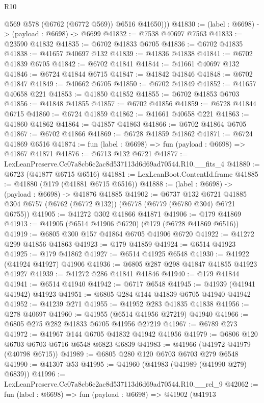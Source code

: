 \begin{lexlean}{R10}
\begin{coremodule}
          @569
          @578
          (@6762 (@6772 @569))
          @6516
          @41650)))
@41830 := (label : @6698) -> (payload : @6698) -> @6699
@41832 := @7538 @40697 @7563
@41833 := @23590 @41832
@41835 := @6702 @41833 @6705
@41836 := @6702 @41835
@41838 := @41657 @40697 @132
@41839 := @41836 @41838
@41841 := @6702 @41839 @6705
@41842 := @6702 @41841
@41844 := @41661 @40697 @132
@41846 := @6724 @41844 @6715
@41847 := @41842 @41846
@41848 := @6702 @41847
@41849 := @40662 @6705
@41850 := @6702 @41849
@41852 := @41657 @40658 @221
@41853 := @41850 @41852
@41855 := @6702 @41853 @6703
@41856 := @41848 @41855
@41857 := @6702 @41856
@41859 := @6728 @41844 @6715
@41860 := @6724 @41859
@41862 := @41661 @40658 @221
@41863 := @41860 @41862
@41864 := @41857 @41863
@41866 := @6702 @41864 @6705
@41867 := @6702 @41866
@41869 := @6728 @41859 @41862
@41871 := @6724 @41869 @6516
@41874 := fun (label : @6698) => fun (payload : @6698) => @41867 @41871
@41876 := @6713 @132 @6721
@41877 := LexLeanPreserve.Cc07a8cb6c2ac8d537113d6d69ad70544.R10.__fits_4
@41880 := @6723 (@41877 @6715 @6516)
@41881 := LexLeanBoot.ContentId.frame
@41885 := @41880 (@179 (@41881 @6715 @6516))
@41888 := (label : @6698) -> (payload : @6698) -> @41876 @41885
@41902 := @6737
    @132
    @6721
    @41885
    @304
    @6757
    (@6762 (@6772 @132))
    (@6778 (@6779 (@6780 @304) @6721 @6755))
@41905 := @41272 @302 @41866 @41871
@41906 := @179 @41869
@41913 := @41905 (@6514 @41906 @6720) (@179 (@6728 @41869 @6516))
@41919 := @6805 @300 @157 @41864 @6705 @41906 @6720
@41922 := @41272 @299 @41856 @41863
@41923 := @179 @41859
@41924 := @6514 @41923
@41925 := @179 @41862
@41927 := @6514 @41925 @6548
@41930 := @41922 (@41924 @41927) @41906
@41936 := @6805 @287 @298 @41847 @41855 @41923 @41927
@41939 := @41272 @286 @41841 @41846
@41940 := @179 @41844
@41941 := @6514 @41940
@41942 := @6717 @6548
@41945 := @41939 (@41941 @41942) @41923
@41951 := @6805 @284 @144 @41839 @6705 @41940 @41942
@41952 := @41239 @271
@41955 := @41952 @283 @41835 @41838
@41956 := @278 @40697
@41960 := @41955 (@6514 @41956 @27219) @41940
@41966 := @6805 @275 @282 @41833 @6705 @41956 @27219
@41967 := @6789 @273
@41972 := @41967 @144 @6705 @41832 @41942 @41956
@41979 := @6806 @120 @6703 @6703 @6716 @6548 @6823 @6839
@41983 := @41966 (@41972 @41979 (@40798 @6715))
@41989 := @6805 @280 @120 @6703 @6703 @279 @6548
@41990 := @41307 @53
@41995 := @41960 (@41983 (@41989 (@41990 @279) @6839))
@41996 := LexLeanPreserve.Cc07a8cb6c2ac8d537113d6d69ad70544.R10.__rel_9
@42062 := fun (label : @6698) =>
  fun (payload : @6698) =>
  @41902
    (@41913

\end{coremodule}
\end{lexlean}
